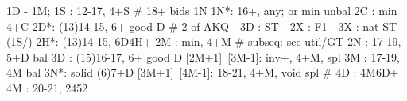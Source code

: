 1D - 1M;
1S : 12-17, 4+S  # 18+ bids 1N
1N*: 16+, any; or min unbal
2C : min 4+C
2D*: (13)14-15, 6+ good D  # 2 of AKQ
   - 3D : ST
   - 2X : F1
   - 3X : nat ST
(1S/) 2H*: (13)14-15, 6D4H+ 
2M : min, 4+M  # subseq: see util/GT
2N : 17-19, 5+D bal
3D : (15)16-17, 6+ good D 
[2M+1]~[3M-1]: inv+, 4+M, spl
3M : 17-19, 4M bal
3N*: solid (6)7+D
[3M+1]~[4M-1]: 18-21, 4+M, void spl  # 4D : 4M6D+
4M : 20-21, 2452
